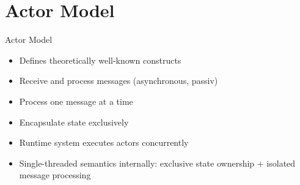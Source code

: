\documentclass{beamer}
\begin{document}

\section{Actor Model}






\begin{frame}{Actor Model}

\pause

\begin{itemize}
  \item Defines theoretically well-known constructs
  \item Receive and process messages (asynchronous, passiv)
  \item Process one message at a time
  \item Encapsulate state exclusively
  \item Runtime system executes actors concurrently
  \item Single-threaded semantics internally: exclusive state ownership $+$ isolated message processing
\end{itemize}

\end{frame}



  
\end{document}
